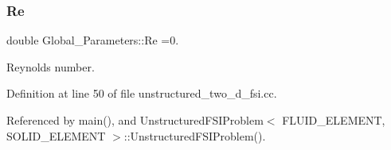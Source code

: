 \subsubsection{\texorpdfstring{Re}{Re}}
{\footnotesize\ttfamily double Global\+\_\+\+Parameters\+::\+Re =0.}



Reynolds number. 



Definition at line 50 of file unstructured\+\_\+two\+\_\+d\+\_\+fsi.\+cc.



Referenced by main(), and Unstructured\+F\+S\+I\+Problem$<$ F\+L\+U\+I\+D\+\_\+\+E\+L\+E\+M\+E\+N\+T, S\+O\+L\+I\+D\+\_\+\+E\+L\+E\+M\+E\+N\+T $>$\+::\+Unstructured\+F\+S\+I\+Problem().

